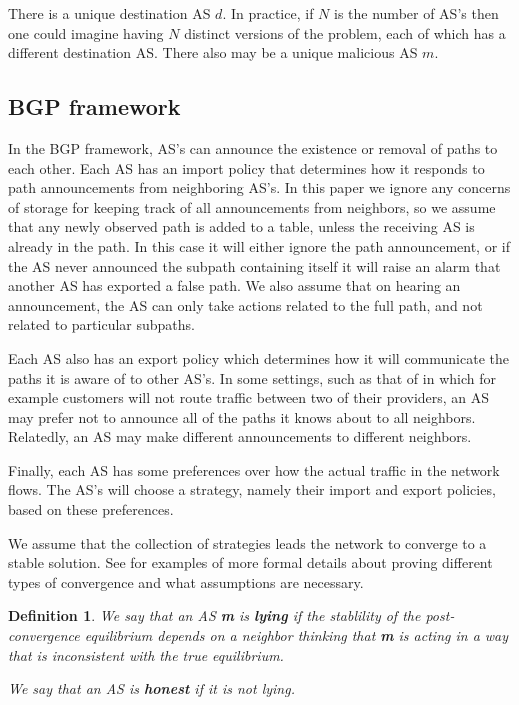 \documentclass[10pt]{article}
\newtheorem{definition}{Definition}
\begin{document}
There is a unique destination AS $d$. In practice, if $N$ is the number of AS's then one could imagine having $N$ distinct versions of the problem, each of which has a different destination AS. There also may be a unique malicious AS $m$.

\subsection{BGP framework}
In the BGP framework, AS's can announce the existence or removal of paths to each other. Each AS has an import policy that determines how it responds to path announcements from neighboring AS's. In this paper we ignore any concerns of storage for keeping track of all announcements from neighbors, so we assume that any newly observed path is added to a table, unless the receiving AS is already in the path. In this case it will either ignore the path announcement, or if the AS never announced the subpath containing itself it will raise an alarm that another AS has exported a false path. We also assume that on hearing an announcement, the AS can only take actions related to the full path, and not related to particular subpaths.

Each AS also has an export policy which determines how it will communicate the paths it is aware of to other AS's. In some settings, such as that of \cite{GaoRexford} in which for example customers will not route traffic between two of their providers, an AS may prefer not to announce all of the paths it knows about to all neighbors. Relatedly, an AS may make different announcements to different neighbors.

Finally, each AS has some preferences over how the actual traffic in the network flows. The AS's will choose a strategy, namely their import and export policies, based on these preferences.

We assume that the collection of strategies leads the network to converge to a stable solution. See \cite{RoutingGames, Attraction, PolicyPathVector} for examples of more formal details about proving different types of convergence and what assumptions are necessary.

\begin{definition}
We say that an AS \textbf{m} is \textbf{lying} if the stablility of the post-convergence equilibrium depends on a neighbor thinking that \textbf{m} is acting in a way that is inconsistent with the true equilibrium.

We say that an AS is \textbf{honest} if it is not lying.
\end{definition}
\end{document}
